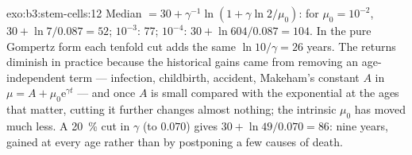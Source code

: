 \begin{solution}{exo:b3:stem-cells:12}
Median $= 30 + \gamma^{-1}\ln(1 + \gamma\ln 2/\mu_{0})$: for $\mu_{0} =
10^{-2}$, $30 + \ln 7/0.087 = 52$; $10^{-3}$: 77; $10^{-4}$: $30 +
\ln 604/0.087 = 104$. In the pure Gompertz form each tenfold cut adds the
same $\ln 10/\gamma = 26$ years. The returns diminish in practice
because the historical gains came from removing an age-independent term
--- infection, childbirth, accident, Makeham's constant $A$ in $\mu = A
+ \mu_{0}\mathrm{e}^{\gamma t}$ --- and once $A$ is small compared with the
exponential at the ages that matter, cutting it further changes almost
nothing; the intrinsic $\mu_{0}$ has moved much less. A \qty{20}{\%} cut
in $\gamma$ (to $0.070$) gives $30 + \ln 49/0.070 = 86$: nine years,
gained at every age rather than by postponing a few causes of death.
\end{solution}

